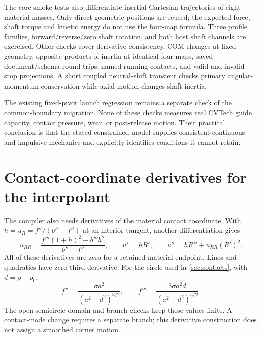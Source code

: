 \documentclass[11pt,letterpaper]{article}
\numberwithin{equation}{section}
\begin{document}
The core smoke tests also differentiate inertial Cartesian trajectories of
eight material masses. Only direct geometric positions are reused; the
expected force, shaft torque and kinetic energy do not use the four-map
formula. Three profile families, forward/reverse/zero shaft rotation, and both
host shaft channels are exercised. Other checks cover derivative consistency,
COM changes at fixed geometry, opposite products of inertia at identical four
maps, saved-document/schema round trips, named running contacts, and valid and
invalid stop projections. A short coupled neutral-shift transient checks
primary angular-momentum conservation while axial motion changes shaft inertia.

The existing fixed-pivot launch regression remains a separate check of the
common-boundary migration. None of these checks measures real CVTech guide
capacity, contact pressure, wear, or post-release motion. Their practical
conclusion is that the stated constrained model supplies consistent continuous
and impulsive mechanics and explicitly identifies conditions it cannot retain.

\appendix
\section{Contact-coordinate derivatives for the interpolant}

The compiler also needs derivatives of the material contact coordinate. With
$h=u_R=f''/(b''-f'')$ at an interior tangent, another differentiation gives
\begin{equation}
 u_{RR}=\frac{f'''(1+h)^2-b'''h^2}{b''-f''},\qquad
 u'=hR',\qquad u''=hR''+u_{RR}(R')^2.
\end{equation}
All of these derivatives are zero for a retained material endpoint. Lines and
quadratics have zero third derivative. For the circle used in
\cref{sec:contacts}, with $d=\rho-\rho_0$,
\begin{equation}
 f''=\frac{\sigma a^2}{(a^2-d^2)^{3/2}},\qquad
 f'''=\frac{3\sigma a^2d}{(a^2-d^2)^{5/2}}.
\end{equation}
The open-semicircle domain and branch checks keep these values finite. A
contact-mode change requires a separate branch; this derivative construction
does not assign a smoothed corner motion.
\end{document}
